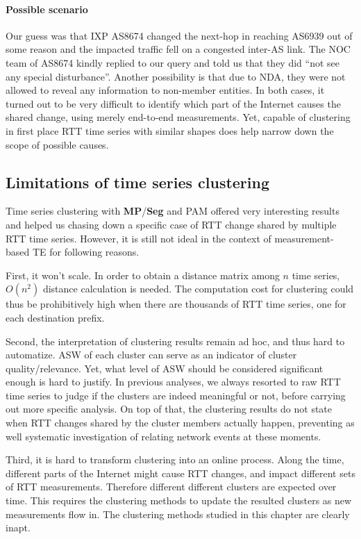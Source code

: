 \paragraph*{Possible scenario} Our guess was that IXP AS8674 changed the next-hop in reaching AS6939 out of some reason and the impacted traffic fell on a congested inter-AS link.
The \acf{NOC} team of AS8674 kindly replied to our query and told us that they did ``not see any special disturbance''. 
Another possibility is that due to \acf{NDA}, they were not allowed to reveal any information to non-member entities.
In both cases, it turned out to be very difficult to identify which part of the Internet causes the shared change, using merely end-to-end measurements.
Yet, capable of clustering in first place RTT time series with similar shapes does help narrow down the scope of possible causes.

\subsection{Limitations of time series clustering}
Time series clustering with \textbf{MP}/\textbf{Seg} and \ac{PAM} offered very interesting results and helped us chasing down a specific case of RTT change shared by multiple RTT time series.
However, it is still not ideal in the context of measurement-based TE for following reasons.

First, it won't scale. In order to obtain a distance matrix among $n$ time series, $O(n^2)$ distance calculation is needed. The computation cost for clustering could thus be prohibitively high when there are thousands of RTT time series, one for each destination prefix. 

Second, the interpretation of clustering results remain ad hoc, and thus hard to automatize. 
\ac{ASW} of each cluster can serve as an indicator of cluster quality/relevance. 
Yet, what level of \ac{ASW} should be considered significant enough is hard to justify. 
In previous analyses, we always resorted to raw RTT time series to judge if the clusters are indeed meaningful or not, before carrying out more specific analysis. 
On top of that, the clustering results do not state when RTT changes shared by the cluster members actually happen, preventing as well systematic investigation of relating network events at these moments.

Third, it is hard to transform clustering into an online process. 
Along the time, different parts of the Internet might cause RTT changes, and impact different sets of RTT measurements.
Therefore different different clusters are expected over time. 
This requires the clustering methods to update the resulted clusters as new measurements flow in. 
The clustering methods studied in this chapter are clearly inapt.

